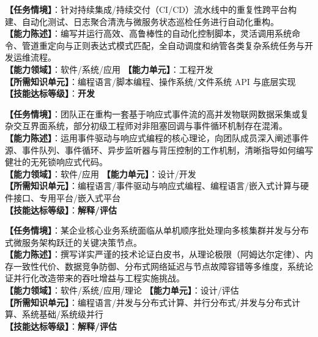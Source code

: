 \begin{taskbox}[任务 2：运用脚本语言高效实现研发运维任务的自动化编排]
\textbf{【任务情境】}：针对持续集成/持续交付（CI/CD）流水线中的重复性跨平台构建、自动化测试、日志聚合清洗与微服务状态巡检任务进行自动化重构。\\
\textbf{【能力陈述】}：编写并运行高效、高鲁棒性的自动化控制脚本，灵活调用系统命令、管道重定向与正则表达式模式匹配，全自动调度和纳管各类复杂系统任务与开发运维流程。\\
\textbf{【能力领域】}：软件/系统/应用 \quad \textbf{【能力单元】}：工程开发\\
\textbf{【所需知识单元】}：编程语言/脚本编程、操作系统/文件系统 API 与底层实现\\
\textbf{【技能达标等级】}：\textbf{开发}
\end{taskbox}

\begin{taskbox}[任务 3：向研发团队深度阐释事件驱动与响应式系统的工作机理]
\textbf{【任务情境】}：团队正在重构一套基于响应式事件流的高并发物联网数据采集或复杂交互界面系统，部分初级工程师对非阻塞回调与事件循环机制存在混淆。\\
\textbf{【能力陈述】}：运用事件驱动与响应式编程的核心理论，向团队成员深入阐述事件源、事件队列、事件循环、异步监听器与背压控制的工作机制，清晰指导如何编写健壮的无死锁响应式代码。\\
\textbf{【能力领域】}：软件/应用 \quad \textbf{【能力单元】}：设计/开发\\
\textbf{【所需知识单元】}：编程语言/事件驱动与响应式编程、编程语言/嵌入式计算与硬件接口、专用平台/嵌入式平台\\
\textbf{【技能达标等级】}：\textbf{解释/评估}
\end{taskbox}

\begin{taskbox}[任务 4：撰写专业技术白皮书论证并行与分布式计算的技术收益与工程挑战]
\textbf{【任务情境】}：某企业核心业务系统面临从单机顺序批处理向多核集群并发与分布式微服务架构跃迁的关键决策节点。\\
\textbf{【能力陈述】}：撰写详实严谨的技术论证白皮书，从理论极限（阿姆达尔定律）、内存一致性代价、数据竞争防御、分布式网络延迟与节点故障容错等多维度，系统论证并行化改造带来的吞吐增益与工程实施挑战。\\
\textbf{【能力领域】}：软件/系统/应用/理论 \quad \textbf{【能力单元】}：设计/评估\\
\textbf{【所需知识单元】}：编程语言/并发与分布式计算、并行分布式/并发与分布式计算、系统基础/系统级并行\\
\textbf{【技能达标等级】}：\textbf{解释/评估}
\end{taskbox}

